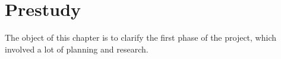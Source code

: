 \chapter{Prestudy}

The object of this chapter is to clarify the first phase of the project, which involved a lot of planning and research. 



\newpage




